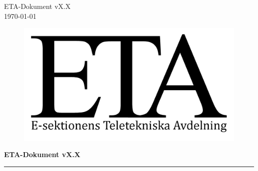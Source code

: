 \documentclass[a4paper, 12pt]{article}
\newcommand{\version}{vX.X} %
\newcommand{\titel}{ETA-Dokument \version} %
\begin{document}
\titlespacing{\subsection}{0pt}{\parskip}{-\parskip}
\titlespacing{\subsubsection}{0pt}{\parskip}{-\parskip}

\flushright
\titel\\
\today

\flushleft

\begin{figure}[h]
    \includegraphics[scale = 2]{ETA-logga.png}
\end{figure}
{\LARGE \textbf{\titel}}         %
\newline
\noindent\rule{\textwidth}{1pt}                  %
\end{document}
